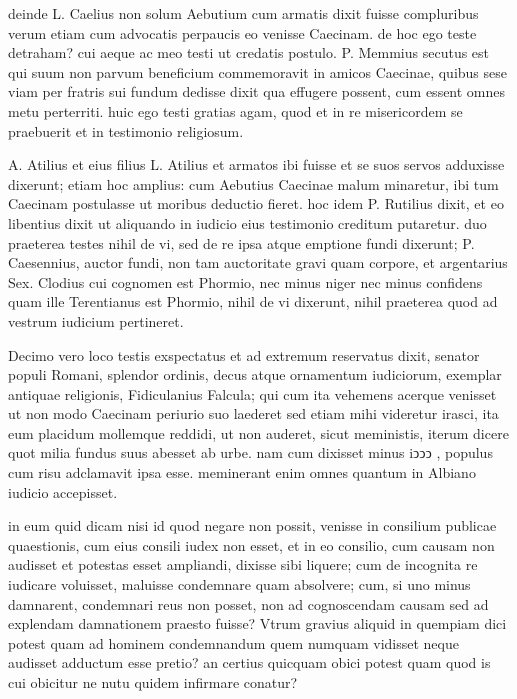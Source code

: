  deinde L. Caelius non solum Aebutium cum armatis dixit fuisse compluribus verum etiam cum advocatis perpaucis eo venisse Caecinam. de hoc ego teste detraham? cui aeque ac meo testi ut credatis postulo. P. Memmius secutus est qui suum non parvum beneficium commemoravit in amicos Caecinae, quibus sese viam per fratris sui fundum dedisse dixit qua effugere possent, cum essent omnes metu perterriti. huic ego testi gratias agam, quod et in re misericordem se praebuerit et in testimonio religiosum.

 A. Atilius et eius filius L. Atilius et armatos ibi fuisse et se suos servos adduxisse dixerunt; etiam hoc amplius: cum Aebutius Caecinae malum minaretur, ibi tum Caecinam postulasse ut moribus deductio fieret. hoc idem P. Rutilius dixit, et eo libentius dixit ut aliquando in iudicio eius testimonio creditum putaretur. duo praeterea testes nihil de vi, sed de re ipsa atque emptione fundi dixerunt; P. Caesennius, auctor fundi, non tam auctoritate gravi quam corpore, et argentarius Sex. Clodius cui cognomen est Phormio, nec minus niger nec minus confidens quam ille Terentianus est Phormio, nihil de vi dixerunt, nihil praeterea quod ad vestrum iudicium pertineret.

 Decimo vero loco testis exspectatus et ad extremum reservatus dixit, senator populi Romani, splendor ordinis, decus atque ornamentum iudiciorum, exemplar antiquae religionis, Fidiculanius Falcula; qui cum ita vehemens acerque venisset ut non modo Caecinam periurio suo laederet sed etiam mihi videretur irasci, ita eum placidum mollemque reddidi, ut non auderet, sicut meministis, iterum dicere quot milia fundus suus abesset ab urbe. nam cum dixisset minus iↄↄↄ , populus cum risu adclamavit ipsa esse. meminerant enim omnes quantum in Albiano iudicio accepisset.

 in eum quid dicam nisi id quod negare non possit, venisse in consilium publicae quaestionis, cum eius consili iudex non esset, et in eo consilio, cum causam non audisset et potestas esset ampliandi, dixisse sibi liquere; cum de incognita re iudicare voluisset, maluisse condemnare quam absolvere; cum, si uno minus damnarent, condemnari reus non posset, non ad cognoscendam causam sed ad explendam damnationem praesto fuisse? Vtrum gravius aliquid in quempiam dici potest quam ad hominem condemnandum quem numquam vidisset neque audisset adductum esse pretio? an certius quicquam obici potest quam quod is cui obicitur ne nutu quidem infirmare conatur?

